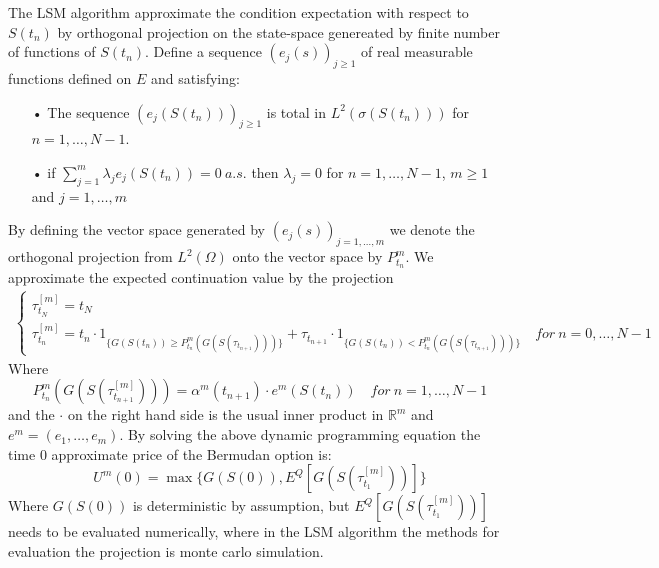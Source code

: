 The LSM algorithm approximate the condition expectation with respect to $S(t_{n})$ by orthogonal projection on the state-space genereated by finite number of functions of $S(t_{n})$. Define a sequence $(e_{j}(s))_{j\geq 1}$ of real measurable functions defined on $E$ and satisfying:
\begin{enumerate}\label{AssumptionBasisFck}
\item[•] The sequence $(e_{j}(S(t_n)))_{j\geq 1}$ is total in $L^2(\sigma(S(t_n)))$ for $n=1,\ldots,N-1$.
\item[•] if $\sum_{j=1}^{m} \lambda_j e_{j}(S(t_n))=0 \ a.s.$ then $\lambda_j=0$ for $n=1,\ldots,N-1$, $m\geq 1$ and $j=1,\ldots,m$
\end{enumerate}
By defining the vector space generated by $(e_{j}(s))_{j=1, \ldots, m}$ we denote the orthogonal projection from $L^2(\Omega)$ onto the vector space by $P^m_{t_n}$.
We approximate the expected continuation value by the projection
\begin{equation}\label{LSMDynamic2}
\begin{split}
\begin{cases}
          \tau_{t_N}^{[m]} = t_N\\
          \tau_{t_n}^{[m]} = t_n \cdot 1_{\{G(S(t_n)) \geq P^m_{t_n}(G(S(\tau_{t_{n+1}})))\}} + \tau_{t_{n+1}} \cdot 1_{\{G(S(t_n)) < P^m_{t_n}(G(S(\tau_{t_{n+1}}))) \}} \quad for \ n={0,\ldots,N-1} 
\end{cases}
\end{split}
\end{equation}
Where
$$P^m_{t_n}(G(S(\tau^{[m]}_{t_{n+1}})))=\alpha^{m}(t_{n+1}) \cdot e^m(S(t_{n})) \quad for \ n=1,\ldots,N-1$$
and the $\cdot$ on the right hand side is the usual inner product in $\mathbb{R}^m$ and $e^m=(e_1,\ldots, e_m)$.
By solving the above dynamic programming equation the time 0 approximate price of the Bermudan option is:
$$U^m(0)=\max \{ G(S(0)), E^Q[G(S(\tau^{[m]}_{t_1}))]\}$$
Where $G(S(0))$ is deterministic by assumption, but $E^Q[G(S(\tau^{[m]}_{t_1}))]$ needs to be evaluated numerically, where in the LSM algorithm the methods for evaluation the projection is monte carlo simulation.\\

